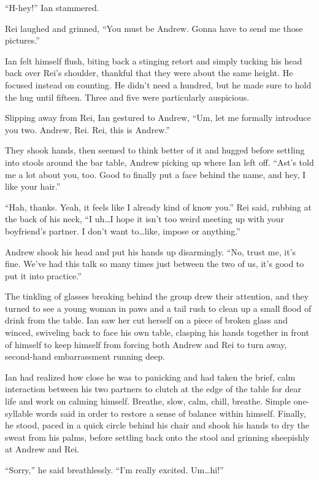 \documentclass[12pt,letterpaper,oneside]{memoir}
\begin{document}
  ``H-hey!'' Ian stammered.

  Rei laughed and grinned, ``You must be Andrew. Gonna have to send me those pictures.''

  Ian felt himself flush, biting back a stinging retort and simply tucking his head back over Rei's shoulder, thankful that they were about the same height. He focused instead on counting. He didn't need a hundred, but he made sure to hold the hug until fifteen. Three and five were particularly auspicious.

  Slipping away from Rei, Ian gestured to Andrew, ``Um, let me formally introduce you two. Andrew, Rei. Rei, this is Andrew.''

  They shook hands, then seemed to think better of it and hugged before settling into stools around the bar table, Andrew picking up where Ian left off. ``Ast's told me a lot about you, too. Good to finally put a face behind the name, and hey, I like your hair.''

  ``Hah, thanks. Yeah, it feels like I already kind of know you.'' Rei said, rubbing at the back of his neck, ``I uh\ldots{}I hope it isn't too weird meeting up with your boyfriend's partner. I don't want to\ldots{}like, impose or anything.''

  Andrew shook his head and put his hands up disarmingly. ``No, trust me, it's fine. We've had this talk so many times just between the two of us, it's good to put it into practice.''

  The tinkling of glasses breaking behind the group drew their attention, and they turned to see a young woman in paws and a tail rush to clean up a small flood of drink from the table. Ian saw her cut herself on a piece of broken glass and winced, swiveling back to face his own table, clasping his hands together in front of himself to keep himself from forcing both Andrew and Rei to turn away, second-hand embarrassment running deep.

  Ian had realized how close he was to panicking and had taken the brief, calm interaction between his two partners to clutch at the edge of the table for dear life and work on calming himself. Breathe, slow, calm, chill, breathe. Simple one-syllable words said in order to restore a sense of balance within himself. Finally, he stood, paced in a quick circle behind his chair and shook his hands to dry the sweat from his palms, before settling back onto the stool and grinning sheepishly at Andrew and Rei.

  ``Sorry,'' he said breathlessly. ``I'm really excited. Um\ldots{}hi!''
\end{document}
